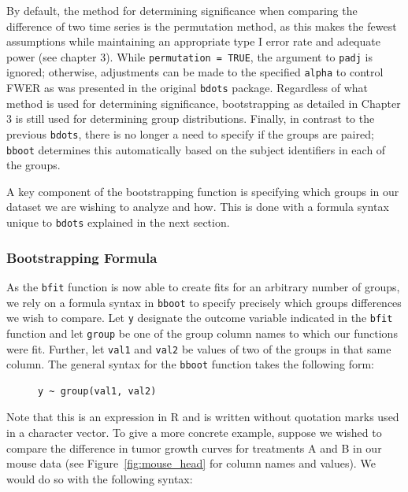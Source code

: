 \documentclass{article}
\newcommand{\xt}{\texttt}%
\begin{document}
By default, the method for determining significance when comparing the difference of two time series is the permutation method, as this makes the fewest assumptions while maintaining an appropriate type I error rate and adequate power (see chapter 3). While \xt{permutation = TRUE}, the argument to \xt{padj} is ignored; otherwise, adjustments can be made to the specified \xt{alpha} to control FWER as was presented in the original \xt{bdots} package. Regardless of what method is used for determining significance, bootstrapping as detailed in Chapter 3 is still used for determining group distributions. Finally, in contrast to the previous \xt{bdots}, there is no longer a need to specify if the groups are paired; \xt{bboot} determines this automatically based on the subject identifiers in each of the groups.

A key component of the bootstrapping function is specifying which groups in our dataset we are wishing to analyze and how. This is done with a formula syntax unique to \xt{bdots} explained in the next section.

\subsubsection{Bootstrapping Formula}

As the \xt{bfit} function is now able to create fits for an arbitrary number of groups, we rely on a formula syntax in \xt{bboot} to specify precisely which groups differences we wish to compare. Let \xt{y} designate the outcome variable indicated in the \xt{bfit} function and let \xt{group} be one of the group column names to which our functions were fit. Further, let \xt{val1} and \xt{val2} be values of two of the groups in that same column. The general syntax for the \xt{bboot} function takes the following form:

\begin{singlespace}
\begin{figure}[H]
\centering
\begin{BVerbatim}
y ~ group(val1, val2)
\end{BVerbatim}
\end{figure}
\end{singlespace}
Note that this is an expression in R and is written without quotation marks used in a character vector. To give a more concrete example, suppose we wished to compare the difference in tumor growth curves for treatments A and B in our mouse data (see Figure~\ref{fig:mouse_head} for column names and values). We would do so with the following syntax:
\end{document}
